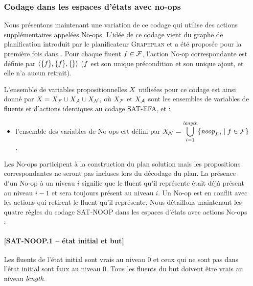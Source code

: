 %
%
\subsubsection{Codage dans les espaces d'états avec no-ops}

Nous présentons maintenant une variation de ce codage qui utilise des actions supplémentaires appelées No-ops.
L'idée de ce codage vient du graphe de planification introduit par le planificateur \textsc{Graphplan} \cite{BF95,BF97} et a été proposée pour la première fois dans \cite{KMS96}. Pour chaque fluent $f\in\mathcal{F}$, l'action No-op correspondante est définie par $\langle \{f\},\{f\},\{\}\rangle$ ($f$ est son unique précondition et son unique ajout, et elle n'a aucun retrait). 

L'ensemble de variables propositionnelles $X$ utilisées pour ce codage est ainsi donné par $X = X_{\mathcal{F}} \cup X_{\mathcal{A}} \cup X_{\mathcal{N}}$, où $X_{\mathcal{F}}$ et $X_{\mathcal{A}}$ sont les ensembles de variables de fluents et d'actions identiques au codage SAT-EFA, et :
\begin{itemize}
    \item l'ensemble des variables de No-ops est défini par $\displaystyle X_{\mathcal{N}}=\bigcup_{i=1}^{\textit{length}}\{\textit{noop}_{f,i}\mid f\in\mathcal{F}\}$.
\end{itemize}

Les No-ops participent à la construction du plan solution mais les propositions correspondantes ne seront pas incluses lors du décodage du plan. La présence d'un No-op à un niveau $i$ signifie que le fluent qu'il représente était déjà présent au niveau $i-1$ et sera toujours présent au niveau $i$. Un No-op est en conflit avec les actions qui retirent le fluent qu'il représente.
Nous détaillons maintenant les quatre règles du codage SAT-NOOP dans les espaces d'états avec actions No-ops :

\paragraph*{[SAT-NOOP.1 -- état initial et but]}
Les fluents de l'état initial sont vrais au niveau $0$ et ceux qui ne sont pas dans l'état initial sont faux au niveau $0$. Tous les fluents du but doivent être vrais au niveau $\textit{length}$.


